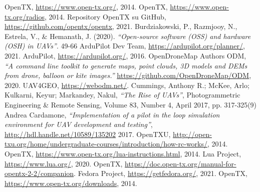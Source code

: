 \titleformat{\chapter}[display]
{\Huge\bfseries}{}{0pt}{}
\clearpage
{}
\begin{thebibliography}{9}
         OpenTX, \underline{https://www.open-tx.org/}, 2014.
         OpenTX, \underline{https://www.open-tx.org/radios}, 2014.
         Repository OpenTX su GitHub, \underline{https://github.com/opentx/opentx}, 2021.
         Burdziakowski, P., Razmjooy, N., Estrela, V., \& Hemanath, J. (2020). \emph{``Open-source software (OSS) and hardware (OSH) in UAVs''}. 49-66
         ArduPilot Dev Team, \underline{https://ardupilot.org/planner/}, 2021.
         ArduPilot, \underline{https://ardupilot.org/}, 2016.
         OpenDroneMap Authors ODM, \emph{``A command line toolkit to generate maps, point clouds, 3D models and DEMs from drone, balloon or kite images.''} \underline{https://github.com/OpenDroneMap/ODM}, 2020.
         UAV4GEO, \underline{https://webodm.net/}.
         Cummings, Anthony R.; McKee, Arlo; Kulkarni, Keyur; Markandey, Nakul, \emph{``The Rise of UAVs''}, Photogrammetric Engineering \& Remote Sensing, Volume 83, Number 4, April 2017, pp. 317-325(9)
         Andrea Cardamone, \emph{``Implementation of a pilot in the loop simulation environment for UAV development and testing''}, \underline{http://hdl.handle.net/10589/135202} 2017.
         OpenTXU, \underline{http://open-txu.org/home/undergraduate-courses/introduction/how-rc-works/}, 2014.
         OpenTX, \underline{https://www.open-tx.org/lua-instructions.html}, 2014.
         Lua Project, \underline{https://www.lua.org/}, 2020.
         OpenTX, \underline{https://doc.open-tx.org/manual-for-opentx-2-2/companion}.
         Fedora Project, \underline{https://getfedora.org/}, 2021.
         OpenTX, \underline{https://www.open-tx.org/downloads}, 2014.
\end{thebibliography}

